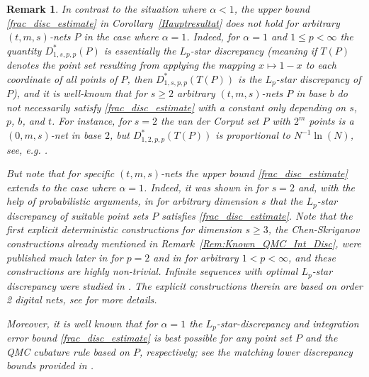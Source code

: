 \documentclass[12pt]{article}
\newtheorem{remark}{Remark}
\newcommand{\mig}[1]{\textcolor{blue}{#1}}
\begin{document}
\begin{remark}\label{Rem:No_Ext_to_alpha_1}
In contrast to the situation where $\alpha < 1$, the upper bound \eqref{frac_disc_estimate} in Corollary~\ref{Hauptresultat} 
does not hold for \emph{arbitrary} $(t,m,s)$-nets $P$  in the case where $\alpha =1$.
Indeed, 
for $\alpha = 1$ and $1\le p < \infty$ the quantity $D^*_{1,s,p,p}(P)$ is essentially the $L_{p}$-star discrepancy (meaning if $T(P)$ denotes the point set resulting from applying the mapping $x\mapsto 1-x$ to each coordinate of all points of $P$, then $D^*_{1,s,p,p}(T(P))$ is the $L_{p}$-star discrepancy of $P$), and 
it is well-known that for $s\ge 2$ arbitrary $(t,m,s)$-nets $P$ in base $b$ do not necessarily satisfy \eqref{frac_disc_estimate} with a constant only depending on $s$, $p$, $b$, and $t$.
For instance, for $s=2$ the van der Corput set $P$ with $2^m$ points is a $(0,m,s)$-net in base $2$, but $D^*_{1,2,p,p}(T(P))$ is proportional to $N^{-1} \ln(N)$, see, e.g. \cite[Section~2.2]{Mat10}.

But note that for \emph{specific} $(t,m,s)$-nets the upper bound 
\eqref{frac_disc_estimate} 
extends to the case where $\alpha =1$.
Indeed, 
it was shown in \cite{Dav56} for $s=2$ and, with the help of probabilistic arguments, in \cite{Roth79, Roth80, Fro80, Che81} for arbitrary dimension $s$ that 
the $L_{p}$-star discrepancy of \emph{suitable} point sets $P$ satisfies \eqref{frac_disc_estimate}.
Note that the first explicit deterministic constructions for dimension $s\ge 3$, the Chen-Skriganov constructions already mentioned in Remark~\ref{Rem:Known_QMC_Int_Disc}, 
were published much later in \cite{CS02} for $p=2$ and in \cite{Skr06} for arbitrary $1<p< \infty$, and these constructions are highly non-trivial. Infinite sequences with optimal $L_p$-star discrepancy were studied in \cite{DHMP17}. The explicit constructions therein are based on order 2 digital nets, see \cite{DHMP17} for more details.

Moreover, it is well known that for $\alpha = 1$ the $L_{p}$-star-discrepancy and integration error bound  \eqref{frac_disc_estimate} is best possible for any point set $P$ and the QMC cubature rule based on $P$, respectively; see the matching lower discrepancy bounds provided in \cite{Roth54, Sch77}. 
\end{remark}
\end{document}
